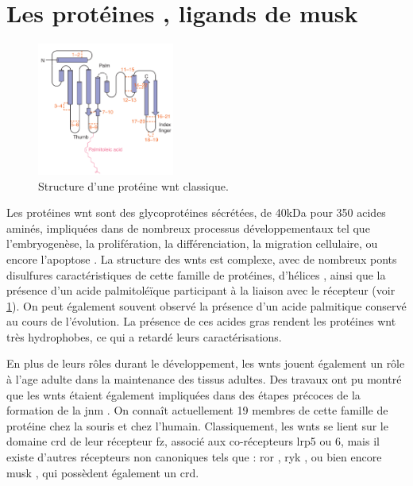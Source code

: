 
\section{Les protéines , ligands de \acrshort{musk}}
\label{sec:IntroWnt}

\begin{figure}
	\includegraphics[width=0.4\textwidth]{./Images/WntProtein.png}	
	\caption{Structure d'une protéine \Gls{wnt} classique.}
	\label{fig:WntProt}
\end{figure}

Les protéines \gls{wnt} sont des glycoprotéines sécrétées, de 40kDa pour 350 acides aminés, impliquées dans de nombreux processus développementaux tel que l'embryogenèse, la prolifération, la différenciation, la migration cellulaire, ou encore l'apoptose \cite{Miller2002, Willert2012}. La structure des \Glspl{wnt} est complexe, avec  de nombreux ponts disulfures caractéristiques de cette famille de protéines, d'hélices \textalpha{}, ainsi que la présence d'un acide palmitoléïque participant à la liaison avec le récepteur (voir \cref{fig:WntProt}). On peut également souvent observé la présence d'un acide palmitique conservé au cours de l'évolution. La présence de ces acides gras rendent les protéines \Gls{wnt} très hydrophobes, ce qui a retardé leurs caractérisations.

En plus de leurs rôles durant le développement, les \Glspl{wnt} jouent également un rôle à l'age adulte dans la maintenance des tissus adultes. Des travaux ont pu montré que les \Glspl{wnt} étaient également impliquées dans des étapes précoces de la formation de la \gls{jnm} \cite{Hall2000}. On connaît actuellement 19 membres de cette famille de protéine chez la souris et chez l'humain. Classiquement, les \Glspl{wnt} se lient sur le domaine \gls{crd} de leur récepteur \gls{fz}, associé aux co-récepteurs \gls{lrp}5 ou 6, mais il existe d'autres récepteurs non canoniques tels que : \gls{ror} \cite{Cadigan2006, Gordon2006, Green2008}, \gls{ryk} \cite{Bovolenta2006, Fradkin2010}, ou bien encore \gls{musk} \cite{Jing2009}, qui possèdent également un \gls{crd}.

